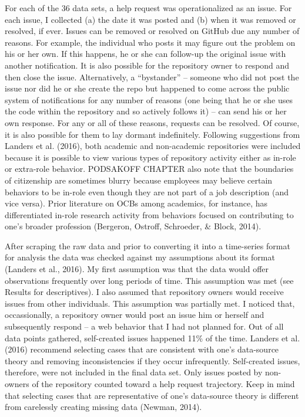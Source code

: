 \documentclass[english,,man]{apa6}
\begin{document}
For each of the 36 data sets, a help request was operationalized as an issue. For each issue, I collected (a) the date it was posted and (b) when it was removed or resolved, if ever. Issues can be removed or resolved on GitHub due any number of reasons. For example, the individual who posts it may figure out the problem on his or her own. If this happens, he or she can follow-up the original issue with another notification. It is also possible for the repository owner to respond and then close the issue. Alternatively, a \enquote{bystander} -- someone who did not post the issue nor did he or she create the repo but happened to come across the public system of notifications for any number of reasons (one being that he or she uses the code within the repository and so actively follows it) -- can send his or her own response. For any or all of these reasons, requests can be resolved. Of course, it is also possible for them to lay dormant indefinitely. Following suggestions from Landers et al. (2016), both academic and non-academic repositories were included because it is possible to view various types of repository activity either as in-role or extra-role behavior. PODSAKOFF CHAPTER also note that the boundaries of citizenship are sometimes blurry because employees may believe certain behaviors to be in-role even though they are not part of a job description (and vice versa). Prior literature on OCBs among academics, for instance, has differentiated in-role research activity from behaviors focused on contributing to one's broader profession (Bergeron, Ostroff, Schroeder, \& Block, 2014).

After scraping the raw data and prior to converting it into a time-series format for analysis the data was checked against my assumptions about its format (Landers et al., 2016). My first assumption was that the data would offer observations frequently over long periods of time. This assumption was met (see Results for descriptives). I also assumed that repository owners would receive issues from other individuals. This assumption was partially met. I noticed that, occassionally, a repository owner would post an issue him or herself and subsequently respond -- a web behavior that I had not planned for. Out of all data points gathered, self-created issues happened 11\% of the time. Landers et al. (2016) recommend selecting cases that are consistent with one's data-source theory and removing inconsistencies if they occur infrequently. Self-created issues, therefore, were not included in the final data set. Only issues posted by non-owners of the repository counted toward a help request trajectory. Keep in mind that selecting cases that are representative of one's data-source theory is different from carelessly creating missing data (Newman, 2014).
\end{document}
